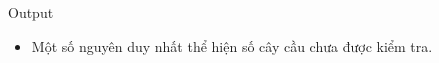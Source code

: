 Output  
\begin{itemize}
	\item     Một số nguyên duy nhất thể hiện số cây cầu chưa được kiểm tra.   
\end{itemize}